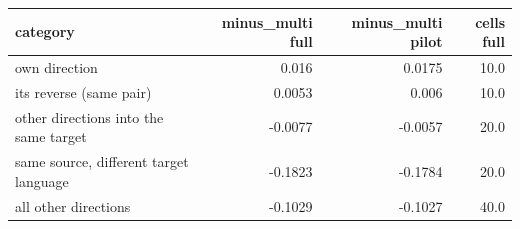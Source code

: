 \begin{tabular}{lrrr}
\toprule
category & minus_multi full & minus_multi pilot & cells full \\
\midrule
own direction & 0.016 & 0.0175 & 10.0 \\
its reverse (same pair) & 0.0053 & 0.006 & 10.0 \\
other directions into the same target & -0.0077 & -0.0057 & 20.0 \\
same source, different target language & -0.1823 & -0.1784 & 20.0 \\
all other directions & -0.1029 & -0.1027 & 40.0 \\
\bottomrule
\end{tabular}
